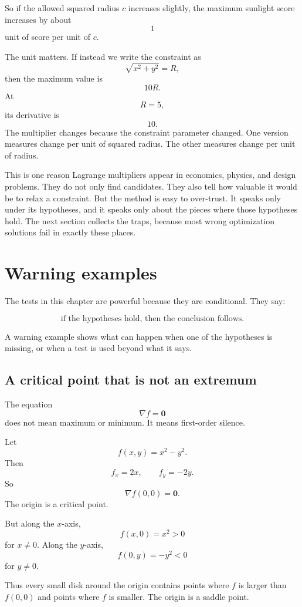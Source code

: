 So if the allowed squared radius \(c\) increases slightly, the maximum sunlight score
increases by about
\[
    1
\]
unit of score per unit of \(c\).

The unit matters.  If instead we write the constraint as
\[
    \sqrt{x^2+y^2}=R,
\]
then the maximum value is
\[
    10R.
\]
At
\[
    R=5,
\]
its derivative is
\[
    10.
\]
The multiplier changes because the constraint parameter changed.  One version measures
change per unit of squared radius.  The other measures change per unit of radius.

This is one reason Lagrange multipliers appear in economics, physics, and design
problems.  They do not only find candidates.  They also tell how valuable it would be
to relax a constraint.  But the method is easy to over-trust.  It speaks only under its
hypotheses, and it speaks only about the pieces where those hypotheses hold.  The next
section collects the traps, because most wrong optimization solutions fail in exactly
these places.

\section{Warning examples}
\label{sec:9.6}

The tests in this chapter are powerful because they are conditional.  They say:

\[
    \text{if the hypotheses hold, then the conclusion follows.}
\]

A warning example shows what can happen when one of the hypotheses is missing, or
when a test is used beyond what it says.

\subsection{A critical point that is not an extremum}

The equation
\[
    \nabla f=\mathbf 0
\]
does not mean maximum or minimum.  It means first-order silence.

Let
\[
    f(x,y)=x^2-y^2.
\]
Then
\[
    f_x=2x,
    \qquad
    f_y=-2y.
\]
So
\[
    \nabla f(0,0)=\mathbf 0.
\]
The origin is a critical point.

But along the \(x\)-axis,
\[
    f(x,0)=x^2>0
\]
for \(x\ne0\).  Along the \(y\)-axis,
\[
    f(0,y)=-y^2<0
\]
for \(y\ne0\).

Thus every small disk around the origin contains points where \(f\) is larger than
\(f(0,0)\) and points where \(f\) is smaller.  The origin is a saddle point.

